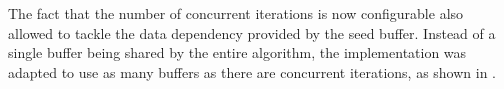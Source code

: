 \documentclass[main.tex]{subfiles}
\begin{document}
The fact that the number of concurrent iterations is now configurable also allowed to tackle the data dependency provided by the seed buffer. Instead of a single buffer being shared by the entire algorithm, the implementation was adapted to use as many buffers as there are concurrent iterations, as shown in .
\end{document}
